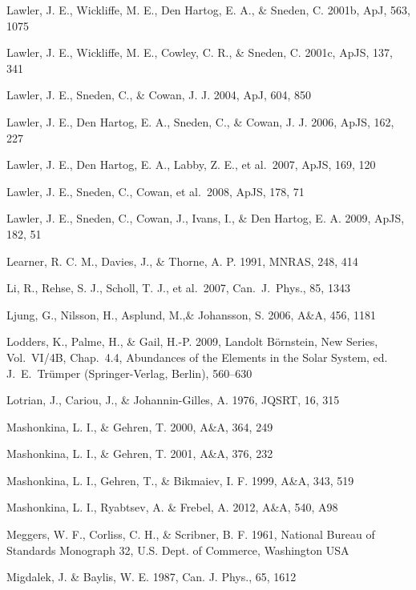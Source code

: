 \documentclass[traditabstract]{aa}
\begin{document}
\begin{thebibliography}{}
  Lawler, J. E., Wickliffe, M. E., Den Hartog, E. A., \& Sneden, C. 2001b, ApJ, 563, 1075

  Lawler, J. E., Wickliffe, M. E., Cowley, C. R., \& Sneden, C. 2001c, ApJS, 137, 341

  Lawler, J. E., Sneden, C., \& Cowan, J. J. 2004, ApJ, 604, 850

  Lawler, J. E., Den Hartog, E. A., Sneden, C., \& Cowan, J. J. 2006, ApJS, 162, 227

  Lawler, J. E., Den Hartog, E. A., Labby, Z. E., et al.\ 2007, ApJS, 169, 120

  Lawler, J. E., Sneden, C., Cowan, et al.\ 2008, ApJS, 178, 71

  Lawler, J. E., Sneden, C., Cowan, J., Ivans, I., \& Den Hartog, E. A. 2009, ApJS, 182, 51

  Learner, R. C. M., Davies, J., \& Thorne, A. P. 1991, MNRAS, 248, 414

  Li, R., Rehse, S. J., Scholl, T. J., et al.\ 2007, Can.\ J.\ Phys., 85, 1343

  Ljung, G.,  Nilsson, H., Asplund, M.,\& Johansson, S. 2006, A\&A, 456, 1181

  Lodders, K., Palme, H., \& Gail, H.-P. 2009, Landolt B\"ornstein, New Series, Vol.\ VI/4B, Chap.\ 4.4, Abundances of the Elements in the Solar System, ed. J.~E.\ Tr\"umper (Springer-Verlag, Berlin), 560--630

  Lotrian, J., Cariou, J., \& Johannin-Gilles, A. 1976, JQSRT, 16, 315

  Mashonkina, L. I., \& Gehren, T. 2000, A\&A, 364, 249

  Mashonkina, L. I., \& Gehren, T. 2001, A\&A, 376, 232

  Mashonkina, L. I., Gehren, T., \& Bikmaiev, I. F. 1999, A\&A, 343, 519

  {Mashonkina}, L. I., {Ryabtsev}, A. \& {Frebel}, A. 2012, A\&A, 540, A98

  Meggers, W. F., Corliss, C. H., \& Scribner, B. F. 1961, National Bureau of Standards Monograph 32, U.S. Dept. of Commerce, Washington USA

  Migdalek, J. \& Baylis, W. E. 1987, Can. J. Phys., 65, 1612


\end{thebibliography}
\end{document}
